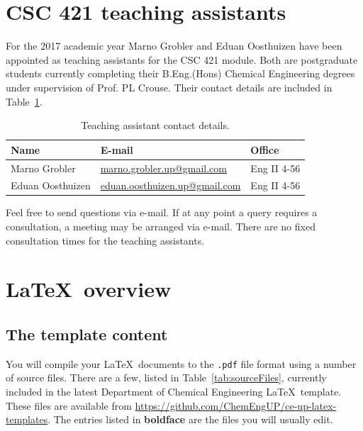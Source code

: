 \documentclass[a4paper,12pt]{article}
\begin{document}
\section{CSC 421 teaching assistants}
\label{sec:TAs}

For the 2017 academic year Marno Grobler and Eduan Oosthuizen have been appointed as teaching assistants for the CSC 421 module.
Both are postgraduate students currently completing their B.Eng.(Hons) Chemical Engineering degrees under supervision of Prof. PL Crouse. 
Their contact details are included in Table~\ref{tab:TAs}.

\begin{table}[htbp]
\centering
\caption[Teaching assistant contact details]{Teaching assistant contact details.}
\label{tab:TAs}
\begin{tabular}{lll}
\toprule
Name & E-mail & Office\\
\midrule
Marno Grobler & \href{mailto:marno.grobler.up@gmail.com}{marno.grobler.up@gmail.com} & Eng II 4-56\\
Eduan Oosthuizen & \href{mailto:eduan.oosthuizen.up@gmail.com}{eduan.oosthuizen.up@gmail.com} & Eng II 4-56\\
\bottomrule
\end{tabular}
\end{table}

Feel free to send questions via e-mail. If at any point a query requires a consultation, a meeting may be arranged via e-mail. There are no fixed consultation times for the teaching assistants.

\section{\LaTeX\ overview}
\subsection{The template content}
You will compile your \LaTeX\ documents to the \texttt{.pdf} file format using a number of source files. There are a few, listed in Table~\ref{tab:sourceFiles}, currently included in the latest Department of Chemical Engineering \LaTeX\ template. These files are available from \href{https://github.com/ChemEngUP/ce-up-latex-templates}{https://github.com/ChemEngUP/ce-up-latex-templates}.
The entries listed in \textbf{boldface} are the files you will usually edit.
\end{document}
